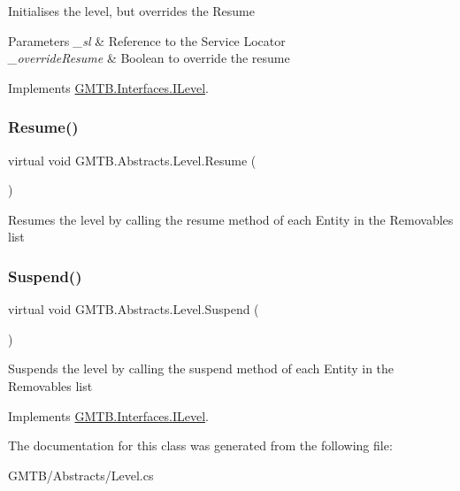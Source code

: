 Initialises the level, but overrides the Resume 


\begin{DoxyParams}{Parameters}
{\em \+\_\+sl} & Reference to the Service Locator\\
\hline
{\em \+\_\+override\+Resume} & Boolean to override the resume\\
\hline
\end{DoxyParams}


Implements \mbox{\hyperlink{interface_g_m_t_b_1_1_interfaces_1_1_i_level}{G\+M\+T\+B.\+Interfaces.\+I\+Level}}.

\mbox{\label{class_g_m_t_b_1_1_abstracts_1_1_level_a06d1dddb97da6fe34a062d2528a51390}} 
\subsubsection{\texorpdfstring{Resume()}{Resume()}}
{\footnotesize\ttfamily virtual void G\+M\+T\+B.\+Abstracts.\+Level.\+Resume (\begin{DoxyParamCaption}{ }\end{DoxyParamCaption})\hspace{0.3cm}{\ttfamily [virtual]}}



Resumes the level by calling the resume method of each Entity in the Removables list 

\mbox{\label{class_g_m_t_b_1_1_abstracts_1_1_level_a087ddc187855a472e6d11692e86573fb}} 
\subsubsection{\texorpdfstring{Suspend()}{Suspend()}}
{\footnotesize\ttfamily virtual void G\+M\+T\+B.\+Abstracts.\+Level.\+Suspend (\begin{DoxyParamCaption}{ }\end{DoxyParamCaption})\hspace{0.3cm}{\ttfamily [virtual]}}



Suspends the level by calling the suspend method of each Entity in the Removables list 



Implements \mbox{\hyperlink{interface_g_m_t_b_1_1_interfaces_1_1_i_level}{G\+M\+T\+B.\+Interfaces.\+I\+Level}}.



The documentation for this class was generated from the following file\+:\begin{DoxyCompactItemize}
\item 
G\+M\+T\+B/\+Abstracts/Level.\+cs\end{DoxyCompactItemize}
